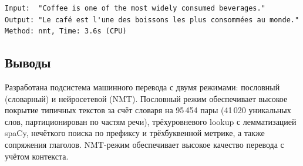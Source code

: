 \begin{lstlisting}[caption={Результат NMT перевода.},label={lst:nmt_result}]
Input:  "Coffee is one of the most widely consumed beverages."
Output: "Le café est l'une des boissons les plus consommées au monde."
Method: nmt, Time: 3.6s (CPU)
\end{lstlisting}

\subsection{Выводы}

Разработана подсистема машинного перевода с двумя режимами:
пословный (словарный) и нейросетевой (NMT). Пословный режим
обеспечивает высокое покрытие типичных текстов за счёт словаря
на 95\,454 пары (41\,020 уникальных слов, партиционирован по частям речи),
трёхуровневого lookup с лемматизацией spaCy, нечёткого поиска по префиксу
и трёхбуквенной метрике, а также сопряжения глаголов. NMT-режим обеспечивает
высокое качество перевода с учётом контекста.
